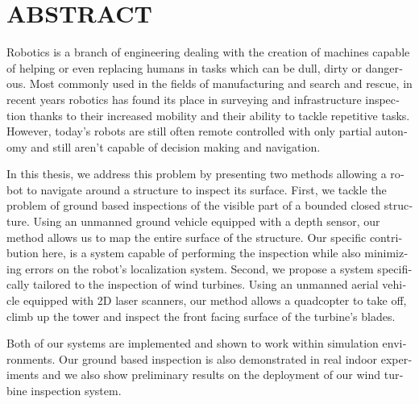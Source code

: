 %

\chapter*{ABSTRACT}\thispagestyle{headings}
%
\begin{otherlanguage}{english}

Robotics is a branch of engineering dealing with the creation of machines capable
of helping or even replacing humans in tasks which can be dull, dirty or dangerous.
Most commonly used in the fields of manufacturing and search and rescue, in recent
years robotics has found its place in surveying and infrastructure inspection
thanks to their increased mobility and their ability to tackle repetitive tasks.
However, today's robots are still often remote controlled with only
partial autonomy and still aren't capable of decision making and navigation.

In this thesis, we address this problem by presenting two methods allowing a robot
to navigate around a structure to inspect its surface. First, we tackle
the problem of ground based inspections of the visible part of a bounded closed
structure. Using an unmanned ground vehicle equipped with a depth sensor, our
method allows us to map the entire surface of the structure. Our specific
contribution here, is a system capable of performing the inspection while also
minimizing errors on the robot's localization system. Second, we
propose a system specifically tailored to the inspection of wind turbines. Using
an unmanned aerial vehicle equipped with 2D laser scanners, our method allows
a quadcopter to take off, climb up the tower and inspect the front facing
surface of the turbine's blades.

Both of our systems are implemented and shown to work within simulation environments.
Our ground based inspection is also demonstrated in real indoor experiments and
we also show preliminary results on the deployment of our wind turbine inspection
system.

\end{otherlanguage}
